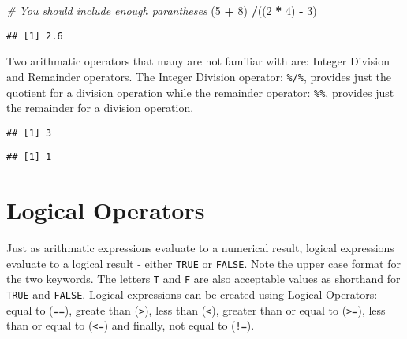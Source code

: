 \documentclass[
]{krantz}
\makeatletter
\newenvironment{Shaded}{\begin{snugshade}}{\end{snugshade}}
\newcommand{\CommentTok}[1]{\textcolor[rgb]{0.37,0.37,0.37}{\textit{#1}}}
\newcommand{\DecValTok}[1]{\textcolor[rgb]{0.06,0.06,0.06}{#1}}
\newcommand{\NormalTok}[1]{#1}
\newcommand{\OperatorTok}[1]{\textcolor[rgb]{0.43,0.43,0.43}{\textbf{#1}}}
\newcommand{\StringTok}[1]{\textcolor[rgb]{0.5,0.5,0.5}{#1}}
\newenvironment{kframe}{%
\medskip{}
\setlength{\fboxsep}{.8em}
 \def\at@end@of@kframe{}%
 \ifinner\ifhmode%
  \def\at@end@of@kframe{\end{minipage}}%
  \begin{minipage}{\columnwidth}%
 \fi\fi%
 \def\FrameCommand##1{\hskip\@totalleftmargin \hskip-\fboxsep
 \colorbox{shadecolor}{##1}\hskip-\fboxsep
     \hskip-\linewidth \hskip-\@totalleftmargin \hskip\columnwidth}%
 \MakeFramed {\advance\hsize-\width
   \@totalleftmargin\z@ \linewidth\hsize
   \@setminipage}}%
 {\par\unskip\endMakeFramed%
 \at@end@of@kframe}
\renewenvironment{Shaded}{\begin{kframe}}{\end{kframe}}
\makeatother
\begin{document}
\begin{Shaded}
\begin{Highlighting}[]
\CommentTok{# You should include enough parantheses}
\NormalTok{(}\DecValTok{5} \OperatorTok{+}\StringTok{ }\DecValTok{8}\NormalTok{) }\OperatorTok{/}\NormalTok{((}\DecValTok{2} \OperatorTok{*}\StringTok{ }\DecValTok{4}\NormalTok{) }\OperatorTok{-}\StringTok{ }\DecValTok{3}\NormalTok{)}
\end{Highlighting}
\end{Shaded}

\begin{verbatim}
## [1] 2.6
\end{verbatim}

Two arithmatic operators that many are not familiar with are: Integer Division and Remainder operators. The Integer Division operator: \texttt{\%/\%}, provides just the quotient for a division operation while the remainder operator: \texttt{\%\%}, provides just the remainder for a division operation.

\begin{Shaded}
\end{Shaded}

\begin{verbatim}
## [1] 3
\end{verbatim}

\begin{Shaded}
\end{Shaded}

\begin{verbatim}
## [1] 1
\end{verbatim}

\hypertarget{logical-operators}{%
\section{Logical Operators}\label{logical-operators}}

Just as arithmatic expressions evaluate to a numerical result, logical expressions evaluate to a logical result - either \texttt{TRUE} or \texttt{FALSE}. Note the upper case format for the two keywords. The letters \texttt{T} and \texttt{F} are also acceptable values as shorthand for \texttt{TRUE} and \texttt{FALSE}. Logical expressions can be created using Logical Operators: equal to (\texttt{==}), greate than (\texttt{\textgreater{}}), less than (\texttt{\textless{}}), greater than or equal to (\texttt{\textgreater{}=}), less than or equal to (\texttt{\textless{}=}) and finally, not equal to (\texttt{!=}).
\end{document}
